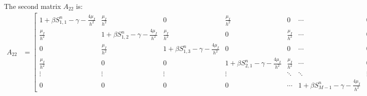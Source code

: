 The second matrix \(A_{22}\) is:
\begin{align*}
    A_{22} &= \scriptscriptstyle
        \begin{bmatrix}
            1 + \beta S_{1,1}^n - \gamma - \tfrac{4\mu_I}{h^2} & \tfrac{\mu_I}{h^2} & 0 & \tfrac{\mu_I}{h^2} & 0 & \cdots & 0 \\
            \tfrac{\mu_I}{h^2} & 1 + \beta S_{1,2}^n - \gamma - \tfrac{4\mu_I}{h^2} & \tfrac{\mu_I}{h^2} & 0 & \tfrac{\mu_I}{h^2} & \cdots & 0 \\
            0 & \tfrac{\mu_I}{h^2} & 1 + \beta S_{1,3}^n - \gamma - \tfrac{4\mu_I}{h^2} & 0 & 0 & \cdots & 0 \\
            \tfrac{\mu_I}{h^2} & 0 & 0 & 1 + \beta S_{2,1}^n - \gamma - \tfrac{4\mu_I}{h^2} & \tfrac{\mu_I}{h^2} & \cdots & 0 \\
            \vdots & \vdots & \vdots & \vdots & \ddots & \ddots & \vdots \\
            0 & 0 & 0 & 0 & \cdots & 1 + \beta S_{M-1}^n - \gamma - \tfrac{4\mu_I}{h^2}
        \end{bmatrix}
\end{align*}

